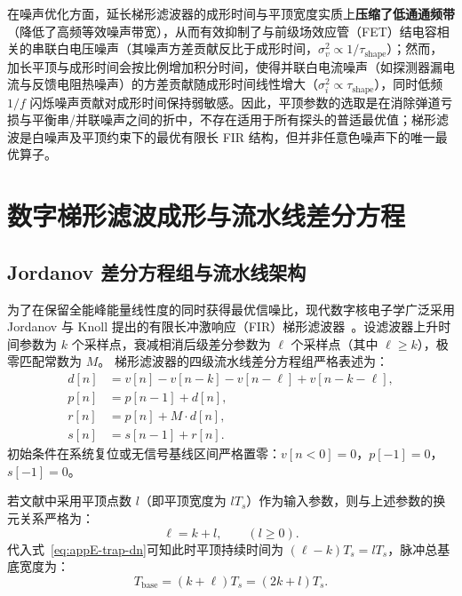 在噪声优化方面，延长梯形滤波器的成形时间与平顶宽度实质上\textbf{压缩了低通通频带}（降低了高频等效噪声带宽），从而有效抑制了与前级场效应管（FET）结电容相关的串联白电压噪声（其噪声方差贡献反比于成形时间，$\sigma_v^2 \propto 1/\tau_{\mathrm{shape}}$）；然而，加长平顶与成形时间会按比例增加积分时间，使得并联白电流噪声（如探测器漏电流与反馈电阻热噪声）的方差贡献随成形时间线性增大（$\sigma_i^2 \propto \tau_{\mathrm{shape}}$），同时低频 $1/f$ 闪烁噪声贡献对成形时间保持弱敏感。因此，平顶参数的选取是在消除弹道亏损与平衡串/并联噪声之间的折中，不存在适用于所有探头的普适最优值；梯形滤波是白噪声及平顶约束下的最优有限长 FIR 结构，但并非任意色噪声下的唯一最优算子。

\section{数字梯形滤波成形与流水线差分方程}\label{sec:appE-trapezoid}

\subsection{Jordanov 差分方程组与流水线架构}

为了在保留全能峰能量线性度的同时获得最优信噪比，现代数字核电子学广泛采用 Jordanov 与 Knoll 提出的有限长冲激响应（FIR）梯形滤波器~\cite{wu-hongyi-2020-general-purpose-digital-daq-thesis}。设滤波器上升时间参数为 $k$ 个采样点，衰减相消后级差分参数为 $\ell$ 个采样点（其中 $\ell \ge k$），极零匹配常数为 $M$。
梯形滤波器的四级流水线差分方程组严格表述为：
\begin{align}
d[n] &= v[n] - v[n-k] - v[n-\ell] + v[n-k-\ell], \label{eq:appE-trap-dn} \\
p[n] &= p[n-1] + d[n], \label{eq:appE-trap-pn} \\
r[n] &= p[n] + M \cdot d[n], \label{eq:appE-trap-rn} \\
s[n] &= s[n-1] + r[n]. \label{eq:appE-trap-sn}
\end{align}
初始条件在系统复位或无信号基线区间严格置零：$v[n < 0] = 0$，$p[-1] = 0$，$s[-1] = 0$。

若文献中采用平顶点数 $l$（即平顶宽度为 $l T_s$）作为输入参数，则与上述参数的换元关系严格为：
\begin{equation}\label{eq:appE-ell-subst}
\ell = k + l, \qquad (l \ge 0).
\end{equation}
代入式~\eqref{eq:appE-trap-dn}可知此时平顶持续时间为 $(\ell - k) T_s = l T_s$，脉冲总基底宽度为：
\begin{equation}\label{eq:appE-fir-length}
T_{\mathrm{base}} = (k + \ell) T_s = (2k + l) T_s.
\end{equation}


